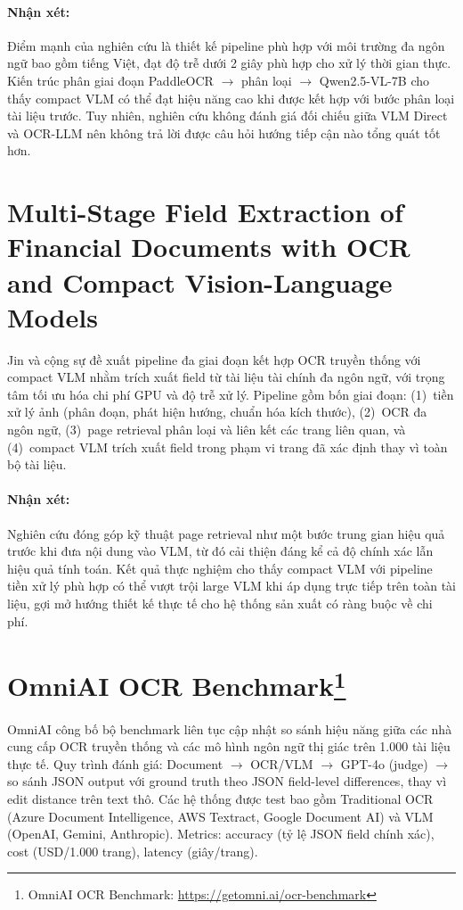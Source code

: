 ﻿\documentclass[12pt]{report}
\begin{document}
\paragraph{Nhận xét:}
Điểm mạnh của nghiên cứu là thiết kế pipeline phù hợp với môi trường đa ngôn ngữ bao gồm tiếng Việt, đạt độ trễ dưới 2 giây phù hợp cho xử lý thời gian thực. Kiến trúc phân giai đoạn PaddleOCR $\rightarrow$ phân loại $\rightarrow$ Qwen2.5-VL-7B cho thấy compact VLM có thể đạt hiệu năng cao khi được kết hợp với bước phân loại tài liệu trước. Tuy nhiên, nghiên cứu không đánh giá đối chiếu giữa VLM Direct và OCR-LLM nên không trả lời được câu hỏi hướng tiếp cận nào tổng quát tốt hơn.

\section[Multi-Stage Field Extraction with Compact VLMs]{Multi-Stage Field Extraction of Financial Documents with OCR and Compact Vision-Language Models}\label{sec:rw_jin}

Jin và cộng sự \cite{jin2025multistage} đề xuất pipeline đa giai đoạn kết hợp OCR truyền thống với compact VLM nhằm trích xuất field từ tài liệu tài chính đa ngôn ngữ, với trọng tâm tối ưu hóa chi phí GPU và độ trễ xử lý. Pipeline gồm bốn giai đoạn: (1)~tiền xử lý ảnh (phân đoạn, phát hiện hướng, chuẩn hóa kích thước), (2)~OCR đa ngôn ngữ, (3)~page retrieval phân loại và liên kết các trang liên quan, và (4)~compact VLM trích xuất field trong phạm vi trang đã xác định thay vì toàn bộ tài liệu.

\paragraph{Nhận xét:}
Nghiên cứu đóng góp kỹ thuật page retrieval như một bước trung gian hiệu quả trước khi đưa nội dung vào VLM, từ đó cải thiện đáng kể cả độ chính xác lẫn hiệu quả tính toán. Kết quả thực nghiệm cho thấy compact VLM với pipeline tiền xử lý phù hợp có thể vượt trội large VLM khi áp dụng trực tiếp trên toàn tài liệu, gợi mở hướng thiết kế thực tế cho hệ thống sản xuất có ràng buộc về chi phí.

\section[OmniAI OCR Benchmark]{OmniAI OCR Benchmark\protect\footnote{OmniAI OCR Benchmark: \url{https://getomni.ai/ocr-benchmark}}}\label{sec:rw_omniai}

OmniAI công bố bộ benchmark liên tục cập nhật so sánh hiệu năng giữa các nhà cung cấp OCR truyền thống và các mô hình ngôn ngữ thị giác trên 1.000 tài liệu thực tế. Quy trình đánh giá: Document $\rightarrow$ OCR/VLM $\rightarrow$ GPT-4o (judge) $\rightarrow$ so sánh JSON output với ground truth theo JSON field-level differences, thay vì edit distance trên text thô. Các hệ thống được test bao gồm Traditional OCR (Azure Document Intelligence, AWS Textract, Google Document AI) và VLM (OpenAI, Gemini, Anthropic). Metrics: accuracy (tỷ lệ JSON field chính xác), cost (USD/1.000 trang), latency (giây/trang).
\end{document}
